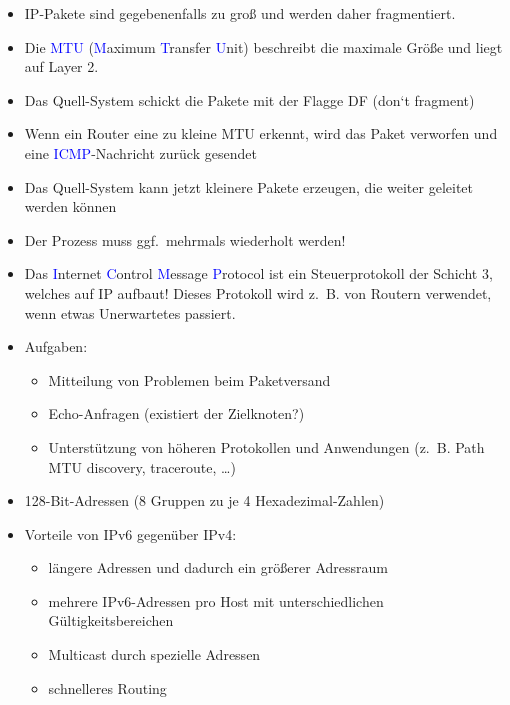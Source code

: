 \begin{itemize}
    \item IP-Pakete sind gegebenenfalls zu groß und werden daher fragmentiert.
    \item Die \textcolor{blue}{MTU} (\textcolor{blue}{M}aximum \textcolor{blue}{T}ransfer \textcolor{blue}{U}nit) beschreibt die maximale Größe und liegt auf Layer 2.
\end{itemize}

\begin{itemize}
    \item Das Quell-System schickt die Pakete mit der Flagge DF (don‘t fragment)
    \item Wenn ein Router eine zu kleine MTU erkennt, wird das Paket verworfen und eine \textcolor{blue}{ICMP}-Nachricht zurück gesendet
    \item Das Quell-System kann jetzt kleinere Pakete erzeugen, die weiter geleitet werden können
    \item Der Prozess muss ggf.\ mehrmals wiederholt werden!
\end{itemize}

\begin{itemize}
    \item Das \textcolor{blue}{I}nternet \textcolor{blue}{C}ontrol \textcolor{blue}{M}essage \textcolor{blue}{P}rotocol ist ein Steuerprotokoll der Schicht 3, welches auf IP aufbaut!
    Dieses Protokoll wird z.\ B. von Routern verwendet, wenn etwas Unerwartetes passiert.
    \item Aufgaben:
    \begin{itemize}
        \item Mitteilung von Problemen beim Paketversand
        \item Echo-Anfragen (existiert der Zielknoten?)
        \item Unterstützung von höheren Protokollen und Anwendungen (z.\ B. Path MTU discovery, traceroute, \ldots)
    \end{itemize}
\end{itemize}

\begin{itemize}
    \item 128-Bit-Adressen (8 Gruppen zu je 4 Hexadezimal-Zahlen)
    \item Vorteile von IPv6 gegenüber IPv4:
    \begin{itemize}
        \item längere Adressen und dadurch ein größerer Adressraum
        \item mehrere IPv6-Adressen pro Host mit unterschiedlichen Gültigkeitsbereichen
        \item Multicast durch spezielle Adressen
        \item schnelleres Routing
    \end{itemize}
\end{itemize}